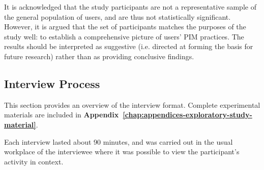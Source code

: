 It is acknowledged that the study participants are not a representative sample of the general population of users, and are thus not statistically significant.  However, it is argued that the set of participants matches the purposes of the study well: to establish a comprehensive picture of users' PIM practices.   The results should be interpreted as suggestive (i.e. directed at forming the basis for future research) rather than as providing conclusive findings.


\subsection{Interview Process}
\label{exp-study:interview-process}
This section provides an overview of the interview format. Complete experimental materials are included in \textbf{Appendix~\ref{chap:appendices-exploratory-study-material}}.

Each interview lasted about 90 minutes, and was carried out in the usual workplace of the interviewee where it was possible to view the participant's activity in context.

